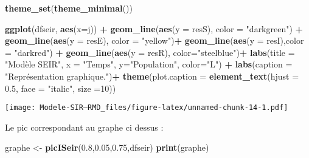 \documentclass[
]{article}
\newenvironment{Shaded}{\begin{snugshade}}{\end{snugshade}}
\newcommand{\DataTypeTok}[1]{\textcolor[rgb]{0.13,0.29,0.53}{#1}}
\newcommand{\DecValTok}[1]{\textcolor[rgb]{0.00,0.00,0.81}{#1}}
\newcommand{\FloatTok}[1]{\textcolor[rgb]{0.00,0.00,0.81}{#1}}
\newcommand{\KeywordTok}[1]{\textcolor[rgb]{0.13,0.29,0.53}{\textbf{#1}}}
\newcommand{\NormalTok}[1]{#1}
\newcommand{\OperatorTok}[1]{\textcolor[rgb]{0.81,0.36,0.00}{\textbf{#1}}}
\newcommand{\StringTok}[1]{\textcolor[rgb]{0.31,0.60,0.02}{#1}}
\begin{document}
\begin{Shaded}
\begin{Highlighting}[]
\KeywordTok{theme_set}\NormalTok{(}\KeywordTok{theme_minimal}\NormalTok{())}

\KeywordTok{ggplot}\NormalTok{(dfseir, }\KeywordTok{aes}\NormalTok{(}\DataTypeTok{x=}\NormalTok{j)) }\OperatorTok{+}\StringTok{                                                    }\KeywordTok{geom_line}\NormalTok{(}\KeywordTok{aes}\NormalTok{(}\DataTypeTok{y =}\NormalTok{ resS), }\DataTypeTok{color =} \StringTok{"darkgreen"}\NormalTok{) }\OperatorTok{+}\StringTok{                         }\KeywordTok{geom_line}\NormalTok{(}\KeywordTok{aes}\NormalTok{(}\DataTypeTok{y =}\NormalTok{ resE), }\DataTypeTok{color =} \StringTok{"yellow"}\NormalTok{)}\OperatorTok{+}\StringTok{                             }\KeywordTok{geom_line}\NormalTok{(}\KeywordTok{aes}\NormalTok{(}\DataTypeTok{y =}\NormalTok{ resI),}\DataTypeTok{color =} \StringTok{"darkred"}\NormalTok{) }\OperatorTok{+}\StringTok{                           }\KeywordTok{geom_line}\NormalTok{(}\KeywordTok{aes}\NormalTok{(}\DataTypeTok{y =}\NormalTok{ resR), }\DataTypeTok{color=}\StringTok{"steelblue"}\NormalTok{)}\OperatorTok{+}\StringTok{                              }\KeywordTok{labs}\NormalTok{(}\DataTypeTok{title =} \StringTok{"Modèle SEIR"}\NormalTok{, }\DataTypeTok{x =} \StringTok{"Temps"}\NormalTok{, }\DataTypeTok{y=}\StringTok{"Population"}\NormalTok{, }\DataTypeTok{color=}\StringTok{"L"}\NormalTok{) }\OperatorTok{+}\StringTok{    }\KeywordTok{labs}\NormalTok{(}\DataTypeTok{caption =} \StringTok{"Représentation graphique."}\NormalTok{)}\OperatorTok{+}\StringTok{                            }\KeywordTok{theme}\NormalTok{(}\DataTypeTok{plot.caption =} \KeywordTok{element_text}\NormalTok{(}\DataTypeTok{hjust =} \FloatTok{0.5}\NormalTok{, }\DataTypeTok{face =} \StringTok{"italic"}\NormalTok{, }\DataTypeTok{size =}\DecValTok{10}\NormalTok{))}
\end{Highlighting}
\end{Shaded}

\texttt{[image: Modele-SIR---RMD\_files/figure-latex/unnamed-chunk-14-1.pdf]}

Le pic correspondant au graphe ci dessus :

\begin{Shaded}
\begin{Highlighting}[]
\NormalTok{graphe <-}\StringTok{ }\KeywordTok{picISeir}\NormalTok{(}\FloatTok{0.8}\NormalTok{,}\FloatTok{0.05}\NormalTok{,}\FloatTok{0.75}\NormalTok{,dfseir)}
\KeywordTok{print}\NormalTok{(graphe)}
\end{Highlighting}
\end{Shaded}
\end{document}
